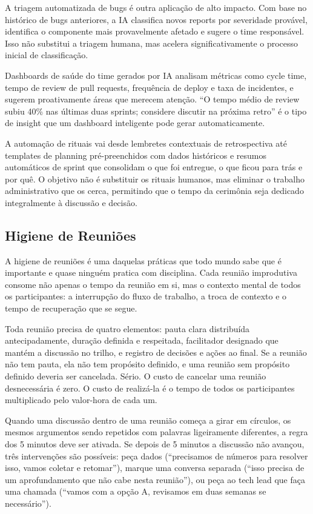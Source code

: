A triagem automatizada de bugs é outra aplicação de alto impacto. Com base
no histórico de bugs anteriores, a IA classifica novos reports por
severidade provável, identifica o componente mais provavelmente afetado e
sugere o time responsável. Isso não substitui a triagem humana, mas acelera
significativamente o processo inicial de classificação.

Dashboards de saúde do time gerados por IA analisam métricas como cycle
time, tempo de review de pull requests, frequência de deploy e taxa de
incidentes, e sugerem proativamente áreas que merecem atenção. ``O tempo
médio de review subiu 40\% nas últimas duas sprints; considere discutir
na próxima retro'' é o tipo de insight que um dashboard inteligente pode
gerar automaticamente.

A automação de rituais vai desde lembretes contextuais de retrospectiva até
templates de planning pré-preenchidos com dados históricos e resumos
automáticos de sprint que consolidam o que foi entregue, o que ficou para
trás e por quê. O objetivo não é substituir os rituais humanos, mas
eliminar o trabalho administrativo que os cerca, permitindo que o tempo
da cerimônia seja dedicado integralmente à discussão e decisão.

\subsection{Higiene de Reuniões}

A higiene de reuniões é uma daquelas práticas que todo mundo sabe que é
importante e quase ninguém pratica com disciplina. Cada reunião improdutiva
consome não apenas o tempo da reunião em si, mas o contexto mental de todos
os participantes: a interrupção do fluxo de trabalho, a troca de
contexto e o tempo de recuperação que se segue.

Toda reunião precisa de quatro elementos: pauta clara distribuída
antecipadamente, duração definida e respeitada, facilitador designado que
mantém a discussão no trilho, e registro de decisões e ações ao final.
Se a reunião não tem pauta, ela não tem propósito definido, e uma reunião
sem propósito definido deveria ser cancelada. Sério. O custo de cancelar
uma reunião desnecessária é zero. O custo de realizá-la é o tempo de todos
os participantes multiplicado pelo valor-hora de cada um.

Quando uma discussão dentro de uma reunião começa a girar em círculos,
os mesmos argumentos sendo repetidos com palavras ligeiramente diferentes,
a regra dos 5 minutos deve ser ativada. Se depois de 5 minutos a discussão
não avançou, três intervenções são possíveis: peça dados (``precisamos de
números para resolver isso, vamos coletar e retomar''), marque uma conversa
separada (``isso precisa de um aprofundamento que não cabe nesta reunião''),
ou peça ao tech lead que faça uma chamada (``vamos com a opção A, revisamos
em duas semanas se necessário'').

